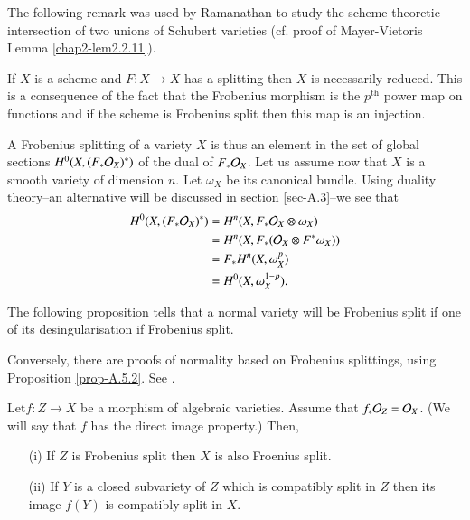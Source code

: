 The following remark was used by Ramanathan to study the scheme
theoretic intersection of two unions of Schubert varieties (cf.\@
proof of Mayer-Vietoris Lemma \ref{chap2-lem2.2.11}).

\begin{remark}\label{rem-A.1.3}
If $X$ is a scheme and $F:X\to X$ has a splitting then $X$ is
necessarily reduced. This is a consequence of the fact that the
Frobenius morphism is the $p^{\text{th}}$ power map on functions and if the
scheme is Frobenius split then this map is an injection.
\end{remark}

A Frobenius splitting of a variety $X$ is thus an element in the set
of global sections $H^{0}(X,(F_{\ast}\mathcal{O}_{X})^{*})$ of the dual of
$F_{\ast}\mathcal{O}_{X}$. Let us assume now that $X$ is a smooth variety of
dimension $n$. Let $\omega_{X}$ be its canonical bundle. 
Using duality
theory--an alternative will be discussed in section \ref{sec-A.3}--we
see that
\begin{align*}
H^{0}(X,(F_{\ast}\mathcal{O}_{X})^{\ast}) &= H^{n}(X,F_{\ast}\mathcal{O}_{X}\otimes
\omega_{X})\\
&= H^{n}(X,F_{\ast}(\mathcal{O}_{X}\otimes F^{\ast}\omega_{X}))\\
&= F_{\ast}H^{n}(X,\omega^{p}_{X})\\
&= H^{0}(X,\omega^{1-p}_{X}).
\end{align*}

The following proposition tells that a normal variety will be
Frobenius split if one of its desingularisation if Frobenius split.

\begin{remark}\label{rem-A.1.4}
Conversely, there are proofs of normality based on Fro\-benius
splittings, using Proposition \ref{prop-A.5.2}. See \cite{key25}. 
\end{remark}

\begin{proposition}\label{prop-A.1.5}
Let\pageoriginale $f:Z\to X$\label{page77} be a morphism of algebraic varieties. Assume that
$f_{\ast}\mathcal{O}_{Z}=\mathcal{O}_{X}$. (We will say that $f$ has the direct image
property.) Then,
\begin{itemize}
\item[\rm(i)] If $Z$ is Frobenius split then $X$ is also Froenius
  split.

\item[\rm(ii)] If $Y$ is a closed subvariety of $Z$ which is
  compatibly split in $Z$ then its image $f(Y)$ is compatibly split in $X$.
\end{itemize}
\end{proposition}

